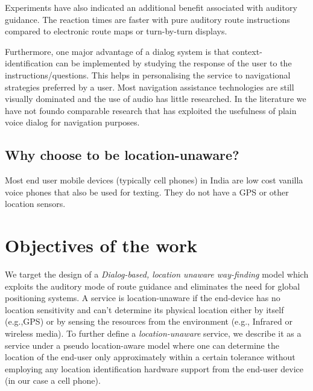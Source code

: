 \documentclass{iitkthesis}
\begin{document}
Experiments \cite{srinivasaneffect} have also indicated an additional 
benefit associated with auditory guidance. The reaction times are 
faster with pure auditory route instructions compared to electronic 
route maps or turn-by-turn displays. 

Furthermore,  one major advantage of a dialog system 
is that context-identification can be implemented by studying the 
response of the user to the instructions/questions. This helps in 
personalising the service to navigational 
strategies preferred by a user. Most navigation assistance 
technologies are still visually dominated and the use of audio has 
little researched. In the literature we have not foundo comparable research 
that has exploited the usefulness of plain voice dialog for 
navigation purposes.
\subsection{Why choose to be location-unaware?}
Most end user mobile devices (typically cell phones)  in India are low cost 
vanilla voice phones that also be used for texting. They do not have a GPS or
other location sensors.


 \section{Objectives of the work}
We target the design of a \textit{Dialog-based, location unaware way-finding
} model which exploits the auditory mode of route guidance and eliminates 
the need for global positioning systems. A service is location-unaware if 
the end-device has no location sensitivity and can't determine its 
physical location either by itself (e.g.,GPS) or by sensing the resources 
from the environment (e.g., Infrared or wireless media). To further 
define a \textit{location-unaware} service, we describe it as a service 
under a pseudo location-aware model where one can determine the 
location of the end-user only approximately within a certain tolerance
without employing any location identification hardware support from the 
end-user device (in our case a cell phone). 
\end{document}
